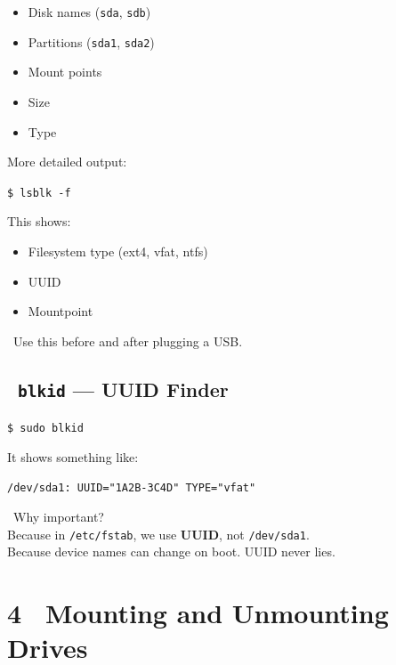 \documentclass[12pt]{article}
\newcommand{\mounticon}{\faFolderOpen}
\begin{document}
\begin{itemize}
    \item Disk names (\texttt{sda}, \texttt{sdb})
    \item Partitions (\texttt{sda1}, \texttt{sda2})
    \item Mount points
    \item Size
    \item Type
\end{itemize}

More detailed output:

\begin{highlightbox}
\texttt{\$ lsblk -f}
\end{highlightbox}

This shows:

\begin{itemize}
    \item Filesystem type (ext4, vfat, ntfs)
    \item UUID
    \item Mountpoint
\end{itemize}

\begin{infobox}
\faFire\ Use this before and after plugging a USB.
\end{infobox}

\subsection*{\faKey\ \texttt{blkid} — UUID Finder}

\begin{highlightbox}
\texttt{\$ sudo blkid}
\end{highlightbox}

It shows something like:

\begin{highlightbox}
\texttt{/dev/sda1: UUID="1A2B-3C4D" TYPE="vfat"}
\end{highlightbox}

\begin{infobox}
\faQuestionCircle\ Why important?\\
Because in \texttt{/etc/fstab}, we use \textbf{UUID}, not \texttt{/dev/sda1}.\\
Because device names can change on boot. UUID never lies.
\end{infobox}

\section*{4 \mounticon\ Mounting and Unmounting Drives}
\end{document}

